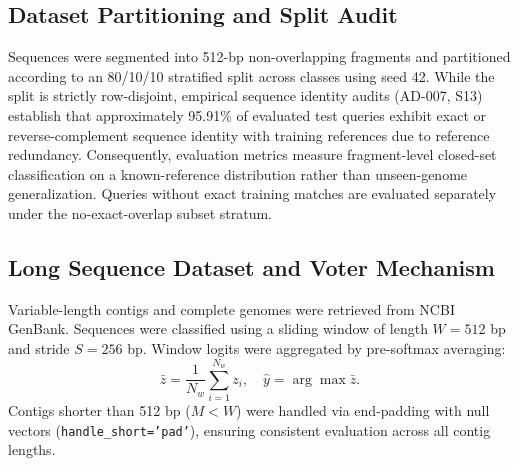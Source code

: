 \documentclass[11pt,a4paper]{article}
\begin{document}
\subsection{Dataset Partitioning and Split Audit}
Sequences were segmented into 512-bp non-overlapping fragments and partitioned according to an 80/10/10 stratified split across classes using seed 42. While the split is strictly row-disjoint, empirical sequence identity audits (AD-007, S13) establish that approximately 95.91\% of evaluated test queries exhibit exact or reverse-complement sequence identity with training references due to reference redundancy. Consequently, evaluation metrics measure fragment-level closed-set classification on a known-reference distribution rather than unseen-genome generalization. Queries without exact training matches are evaluated separately under the no-exact-overlap subset stratum.



\subsection{Long Sequence Dataset and Voter Mechanism}
Variable-length contigs and complete genomes were retrieved from NCBI GenBank. Sequences were classified using a sliding window of length $W = 512$ bp and stride $S = 256$ bp. Window logits were aggregated by pre-softmax averaging:
\begin{equation}
\bar{z} = \frac{1}{N_w} \sum_{i=1}^{N_w} z_i, \quad \hat{y} = \arg\max \bar{z}.
\end{equation}
Contigs shorter than 512 bp ($M < W$) were handled via end-padding with null vectors (\texttt{handle\_short='pad'}), ensuring consistent evaluation across all contig lengths.
\end{document}
